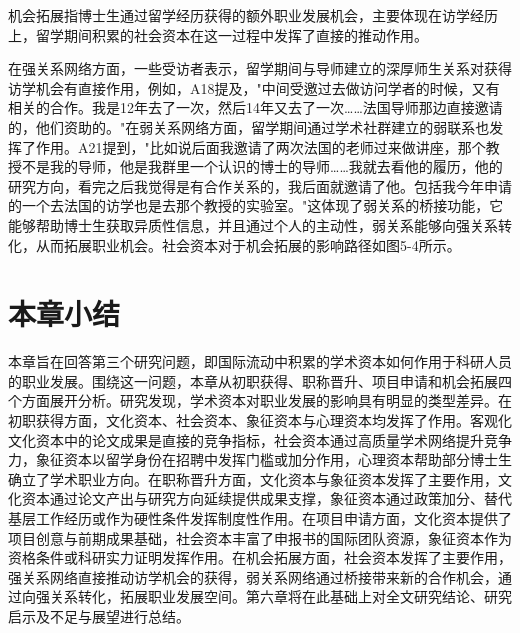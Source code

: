 机会拓展指博士生通过留学经历获得的额外职业发展机会，主要体现在访学经历上，留学期间积累的社会资本在这一过程中发挥了直接的推动作用。

在强关系网络方面，一些受访者表示，留学期间与导师建立的深厚师生关系对获得访学机会有直接作用，例如，A18提及，"中间受邀过去做访问学者的时候，又有相关的合作。我是12年去了一次，然后14年又去了一次……法国导师那边直接邀请的，他们资助的。"在弱关系网络方面，留学期间通过学术社群建立的弱联系也发挥了作用。A21提到，"比如说后面我邀请了两次法国的老师过来做讲座，那个教授不是我的导师，他是我群里一个认识的博士的导师……我就去看他的履历，他的研究方向，看完之后我觉得是有合作关系的，我后面就邀请了他。包括我今年申请的一个去法国的访学也是去那个教授的实验室。"这体现了弱关系的桥接功能，它能够帮助博士生获取异质性信息，并且通过个人的主动性，弱关系能够向强关系转化，从而拓展职业机会。社会资本对于机会拓展的影响路径如图5-4所示。


\section{本章小结}

本章旨在回答第三个研究问题，即国际流动中积累的学术资本如何作用于科研人员的职业发展。围绕这一问题，本章从初职获得、职称晋升、项目申请和机会拓展四个方面展开分析。研究发现，学术资本对职业发展的影响具有明显的类型差异。在初职获得方面，文化资本、社会资本、象征资本与心理资本均发挥了作用。客观化文化资本中的论文成果是直接的竞争指标，社会资本通过高质量学术网络提升竞争力，象征资本以留学身份在招聘中发挥门槛或加分作用，心理资本帮助部分博士生确立了学术职业方向。在职称晋升方面，文化资本与象征资本发挥了主要作用，文化资本通过论文产出与研究方向延续提供成果支撑，象征资本通过政策加分、替代基层工作经历或作为硬性条件发挥制度性作用。在项目申请方面，文化资本提供了项目创意与前期成果基础，社会资本丰富了申报书的国际团队资源，象征资本作为资格条件或科研实力证明发挥作用。在机会拓展方面，社会资本发挥了主要作用，强关系网络直接推动访学机会的获得，弱关系网络通过桥接带来新的合作机会，通过向强关系转化，拓展职业发展空间。第六章将在此基础上对全文研究结论、研究启示及不足与展望进行总结。
